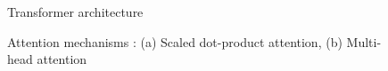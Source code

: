 \begin{figure}
\centering
{}
\caption{Transformer architecture \cite{vaswani2017attention}}
\label{fig:transformer}
\end{figure}

\begin{figure}
\centering
{}
\caption{Attention mechanisms \cite{vaswani2017attention}: (a) Scaled dot-product attention, (b) Multi-head attention}
\label{fig:attention}
\end{figure}
 


